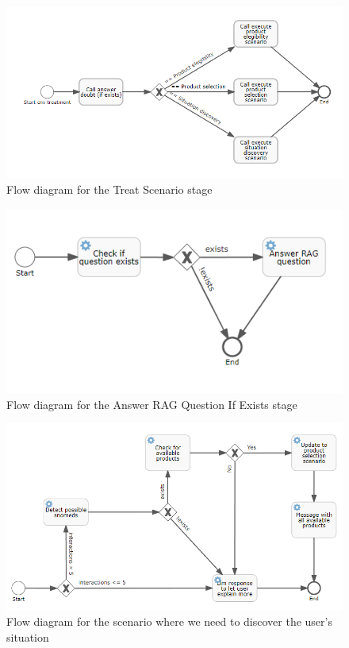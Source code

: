\documentclass[a4paper,12pt,twoside]{ThesisStyle}
\begin{document}
\begin{figure}[htb]
  \centering
  \includegraphics[width=1\textwidth]{imatges/2_DsoTreatScenario.png}
  \caption{Flow diagram for the Treat Scenario stage}
  \label{fig:treatscenario}
\end{figure}

\begin{figure}[htb]
  \centering
  \includegraphics[width=1\textwidth]{imatges/3_AnswerRagQuestionIfExists.png}
  \caption{Flow diagram for the Answer RAG Question If Exists stage}
  \label{fig:answerragquestionifexists}
\end{figure}

\begin{figure}[htb]
  \centering
  \includegraphics[width=1\textwidth]{imatges/4_1_DsoExecuteSituationDiscoveryScenario.png}
  \caption{Flow diagram for the scenario where we need to discover the user's situation}
  \label{fig:executesituationdiscoveryscenario}
\end{figure}
\end{document}
